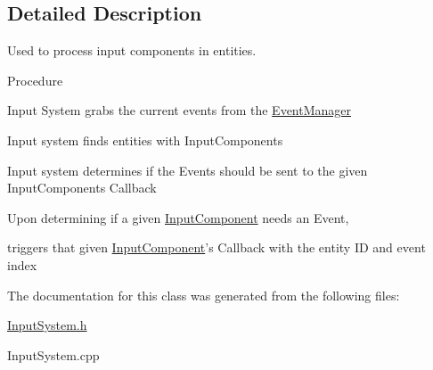 \subsection{Detailed Description}
Used to process input components in entities. 

Procedure


\begin{DoxyItemize}
\item Input System grabs the current events from the \hyperlink{class_event_manager}{Event\-Manager}
\end{DoxyItemize}


\begin{DoxyItemize}
\item Input system finds entities with Input\-Components
\end{DoxyItemize}


\begin{DoxyItemize}
\item Input system determines if the Events should be sent to the given Input\-Components Callback
\end{DoxyItemize}


\begin{DoxyItemize}
\item Upon determining if a given \hyperlink{class_input_component}{Input\-Component} needs an Event,


\begin{DoxyItemize}
\item triggers that given \hyperlink{class_input_component}{Input\-Component}'s Callback with the entity I\-D and event index 
\end{DoxyItemize}
\end{DoxyItemize}

The documentation for this class was generated from the following files\-:\begin{DoxyCompactItemize}
\item 
\hyperlink{_input_system_8h}{Input\-System.\-h}\item 
Input\-System.\-cpp\end{DoxyCompactItemize}
